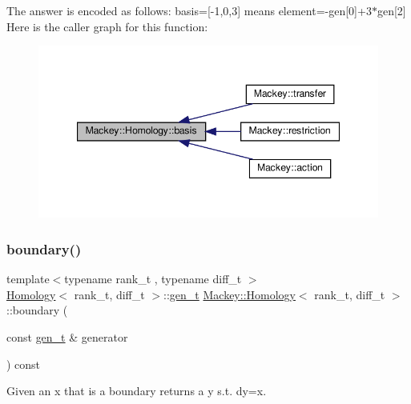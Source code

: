 The answer is encoded as follows\+: basis=\mbox{[}-\/1,0,3\mbox{]} means element=-\/gen\mbox{[}0\mbox{]}+3$\ast$gen\mbox{[}2\mbox{]} Here is the caller graph for this function\+:\nopagebreak
\begin{figure}[H]
\begin{center}
\leavevmode
\includegraphics[width=347pt]{classMackey_1_1Homology_a2e6fb6da3abdba934a1eb2f4236623cb_icgraph}
\end{center}
\end{figure}
\mbox{\label{classMackey_1_1Homology_aeb3cbf5cc7cb166e8e0a552dda57d05b}} 
\subsubsection{\texorpdfstring{boundary()}{boundary()}}
{\footnotesize\ttfamily template$<$typename rank\+\_\+t , typename diff\+\_\+t $>$ \\
\hyperlink{classMackey_1_1Homology}{Homology}$<$ rank\+\_\+t, diff\+\_\+t $>$\+::\hyperlink{classMackey_1_1Homology_a0f7541ee6181c75cb7efa41f3b63f0a5}{gen\+\_\+t} \hyperlink{classMackey_1_1Homology}{Mackey\+::\+Homology}$<$ rank\+\_\+t, diff\+\_\+t $>$\+::boundary (\begin{DoxyParamCaption}\item[{const \hyperlink{classMackey_1_1Homology_a0f7541ee6181c75cb7efa41f3b63f0a5}{gen\+\_\+t} \&}]{generator }\end{DoxyParamCaption}) const}



Given an x that is a boundary returns a y s.\+t. dy=x. 

\mbox{\label{classMackey_1_1Homology_a72296e393c6f22a526375b0169daab94}} 
